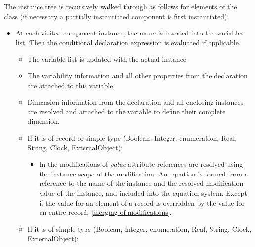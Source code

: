 The instance tree is recursively walked through as follows for elements
of the class (if necessary a partially instantiated component is first
instantiated):
\begin{itemize}
\item
  At each visited component instance, the name is inserted into the
  variables list. Then the conditional declaration expression is
  evaluated if applicable.

  \begin{itemize}
  \item
    The variable list is updated with the actual instance
  \item
    The variability information and all other properties from the
    declaration are attached to this variable.
  \item
    Dimension information from the declaration and all enclosing
    instances are resolved and attached to the variable to define their
    complete dimension.
  \item
    If it is of record or simple type (Boolean, Integer, enumeration,
    Real, String, Clock, ExternalObject):

    \begin{itemize}
    \item
      In the modifications of \emph{value} attribute references are
      resolved using the instance scope of the modification. An equation
      is formed from a reference to the name of the instance and the
      resolved modification value of the instance, and included into the
      equation system. Except if the value for an element of a record is
      overridden by the value for an entire record; \autoref{merging-of-modifications}.
    \end{itemize}
  \item
    If it is of simple type (Boolean, Integer, enumeration, Real,
    String, Clock, ExternalObject):


\end{itemize}
\end{itemize}
